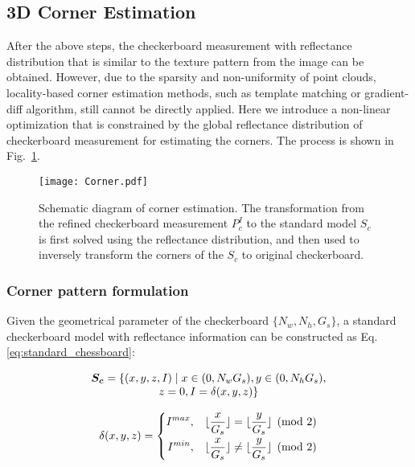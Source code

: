 \documentclass[journal]{vgtc}
\begin{document}
\subsection{3D Corner Estimation}

After the above steps, the checkerboard measurement with reflectance distribution that is similar to the texture pattern from the image can be obtained. However, due to the sparsity and non-uniformity of point clouds, locality-based corner estimation methods, such as template matching or gradient-diff algorithm, still cannot be directly applied. Here we introduce a non-linear optimization that is constrained by the global reflectance distribution of checkerboard measurement for estimating the corners. The process is shown in Fig.~\ref{fig:corner}. 


\begin{figure}[!htb]
	\centering
	\texttt{[image: Corner.pdf]} 
	\caption{Schematic diagram of corner estimation. The transformation from the refined checkerboard measurement $P^I_c$ to the standard model $S_c$ is first solved using the reflectance distribution, and then used to inversely transform the corners of the $S_c$ to original checkerboard.} 
	\label{fig:corner} 
	
\end{figure}


\subsubsection{Corner pattern formulation}
\label{sec:corner_pattern_formulation}

Given the geometrical parameter of the checkerboard $\{N_w, N_h, G_s\}$, a standard checkerboard model with reflectance information can be constructed as Eq.\ref{eq:standard_chessboard}:

\begin{equation}
	\label{eq:standard_chessboard}
	\centering
	\begin{matrix}
		\bm {S_c} = \{ (x,y,z,I) \mid x \in (0, N_w G_s),y \in (0, N_h G_s), 
		\\
		z=0, I=\delta(x,y,z) \}
		\\ \\
		\delta(x,y,z) = 
		\left \{  
		\begin{aligned}
		I^{max}, &   &   
		\lfloor \frac{x} {G_s} \rfloor = \lfloor \frac{y} {G_s} \rfloor  \pmod 2
		\\
		I^{min}, &   &   
		\lfloor \frac{x} {G_s} \rfloor \neq \lfloor \frac{y} {G_s} \rfloor  \pmod 2
		\end{aligned}
		\right.  
	\end{matrix}
\end{equation}
\end{document}
